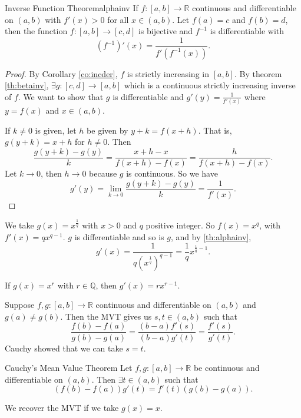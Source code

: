 \begin{theorem}{Inverse Function Theorem}{alphainv}
    If \(f:[a,b]\to\mathbb{R}\) continuous and differentiable on \((a,b)\) with \(f'(x) >0\) for all \(x \in (a,b)\). Let \(f(a) = c\) and \(f(b) = d\), then the function \(f:[a,b]\to[c,d]\) is bijective and \(f^{-1}\) is differentiable with
    \[
        (f^{-1})'(x) = \frac{1}{f'(f^{-1}(x))}.
    \]
\end{theorem}
\begin{proof}
    By Corollary \eqref{co:incder}, \(f\) is strictly increasing in \([a,b]\). By theorem \eqref{th:betainv}, \(\exists g: [c,d] \to [a,b]\) which is a continuous strictly increasing inverse of \(f\). We want to show that \(g\) is differentiable and \(g'(y) = \frac{1}{f'(x)}\) where \(y = f(x)\) and \(x \in (a,b)\).

    If \(k \neq 0\) is given, let \(h\) be given by \(y + k = f(x + h)\). That is, \(g(y + k) = x + h\) for \(h \neq 0\). Then
    \[
        \frac{g(y + k) - g(y)}{k} = \frac{x + h - x}{f(x + h) - f(x)} = \frac{h}{f(x + h) - f(x)}.
    \]
    Let \(k \to 0\), then \(h \to 0\) because \(g\) is continuous. So we have
    \[
        g'(y) = \lim\limits_{k \to 0} \frac{g(y + k) - g(y)}{k} = \frac{1}{f'(x)}.
    \]
\end{proof}
\begin{example}
    We take \(g(x) = x^\frac{1}{q}\) with \(x > 0\) and \(q\) positive integer. So \(f(x) = x^q\), with \(f'(x) = qx^{q-1}\). \(g\) is differentiable and so is \(g\), and by \cref{th:alphainv},
    \[
        g'(x) = \frac{1}{q(x^\frac{1}{q})^{q-1}} = \frac{1}{q}x^{\frac{1}{q} - 1}.
    \]
\end{example}
\begin{remark}
    If \(g(x) = x^r\) with \(r \in \mathbb{Q}\), then \(g'(x) = rx^{r-1}\).
\end{remark}
Suppose \(f,g: [a,b] \to \mathbb{R}\) continuous and differentiable on \((a,b)\) and \(g(a) \neq g(b)\). Then the MVT gives us \(s,t \in (a,b)\) such that
\[
    \frac{f(b) - f(a)}{g(b) - g(a)} = \frac{(b-a)f'(s)}{(b-a)g'(t)}=\frac{f'(s)}{g'(t)}.
\]
Cauchy showed that we can take \(s = t\).
\begin{theorem}{Cauchy's Mean Value Theorem}{}
    Let \(f,g: [a,b] \to \mathbb{R}\) be continuous and differentiable on \((a,b)\). Then \(\exists t \in (a,b)\) such that
    \[
        (f(b) - f(a))g'(t) = f'(t)(g(b) - g(a)).
    \]
\end{theorem}
\begin{remark}
    We recover the MVT if we take \(g(x) = x\).
\end{remark}
